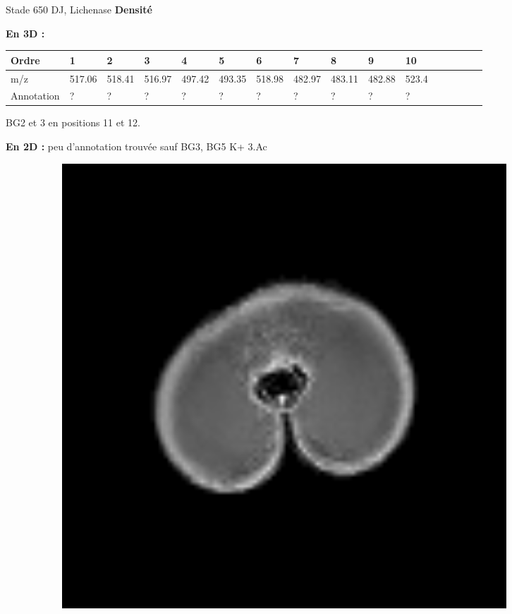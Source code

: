 \documentclass[10pt]{beamer}
\begin{document}
\begin{frame}{Stade 650 DJ, Lichenase}
  \textbf{Densité}
  
  \textbf{En 3D :}
  \vspace{-0.4cm}
    \begin{table}[]
    \centering
    \begin{adjustbox}{max width=1\textwidth}
      \begin{tabular}{llllllllllllllll}
        \toprule
        Ordre & 1       & 2       & 3       & 4       & 5       & 6       & 7       & 8       & 9       & 10       \\
        \midrule
        m/z &    517.06 & 518.41 & 516.97 & 497.42 & 493.35 & 518.98 & 482.97 & 483.11 & 482.88 & 523.4 \\
        Annotation &  ? & ? & ? & ? & ? & ? & ? & ?  & ? & ?\\
        \bottomrule
      \end{tabular}
    \end{adjustbox}
  \end{table}
  \vspace{-0.2cm}
  BG2 et 3 en positions 11 et 12.
  
  \vspace{-0.2cm}
  \textbf{En 2D :} peu d'annotation trouvée sauf BG3, BG5 K+ 3.Ac

  \begin{figure}[ht]
    \centering
    \begin{subfigure}[t]{0.33\textwidth}
      \centering
      \includegraphics[width=0.9\textwidth]{fig/stats_650Lich_density_irm}


\end{subfigure}
\end{figure}
\end{frame}
\end{document}
